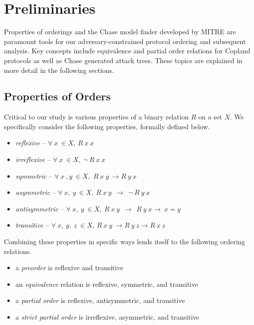 \documentclass[runningheads]{llncs}
\theoremstyle{definition}
\newcommand{\squash}{\itemsep=0pt\parskip=0pt}
\begin{document}
\section{Preliminaries}

Properties of orderings and the Chase model finder developed by MITRE \cite{Ramsdell:2020:Chase} are paramount tools for our adversary-constrained protocol ordering and subsequent analysis. Key concepts include equivalence and partial order relations for Copland protocols as well as Chase generated attack trees. These topics are explained in more detail in the following sections.

\subsection*{Properties of Orders}

Critical to our study is various properties of a binary relation $R$ on a set $X$. We specifically consider the following properties, formally defined below.

\begin{itemize}
    \squash
    \item \emph{reflexive} -- $ \forall\: x\: \in X$, $R\: x\: x$
    \item \emph{irreflexive} -- $ \forall \: x\: \in X, \: \neg \: R\: x\: x$
    \item \emph{symmetric} -- $ \forall\: x\: , y\: \in X,$ $R\: x\: y\:\rightarrow R\: y\: x$
    \item \emph{asymmetric} --  $\forall\: x,\: y\:\in X,\: R\: x\: y\:\: \rightarrow  \:\: \neg \:R\: y\: x $  
    \item \emph{antisymmetric} --  $\forall\: x,\: y\:\in X,\: R\: x\: y\:\: \rightarrow \:\: R\: y\: x \rightarrow \:x = y$ 
    \item \emph{transitive} -- $ \forall\: x,\: y,\: z\:\in X$, $R\: x\: y\: \rightarrow R\: y\: z \rightarrow R\: x\: z$
\end{itemize}

\noindent Combining these properties in specific ways lends itself to the following ordering relations.

\begin{itemize}
    \squash
    \item a \emph{preorder} is reflexive and transitive
    \item an \emph{equivalence} relation is reflexive, symmetric, and transitive 
    \item a \emph{partial order} is reflexive, antisymmetric, and transitive 
    \item a \emph{strict partial order} is irreflexive, asymmetric, and transitive 
\end{itemize}
\end{document}
